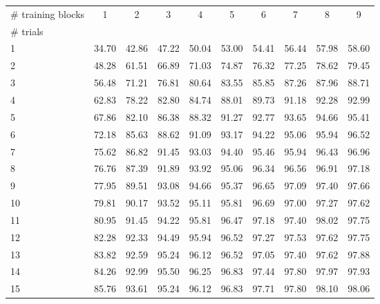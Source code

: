 \begin{tabular}{@{}lccccccccc@{}}
\toprule
\# training blocks & 1 & 2 & 3 & 4 & 5 & 6 & 7 & 8 & 9 \\
\# trials &  &  &  &  &  &  &  &  &  \\
\midrule
1 & 34.70 & 42.86 & 47.22 & 50.04 & 53.00 & 54.41 & 56.44 & 57.98 & 58.60 \\
2 & 48.28 & 61.51 & 66.89 & 71.03 & 74.87 & 76.32 & 77.25 & 78.62 & 79.45 \\
3 & 56.48 & 71.21 & 76.81 & 80.64 & 83.55 & 85.85 & 87.26 & 87.96 & 88.71 \\
4 & 62.83 & 78.22 & 82.80 & 84.74 & 88.01 & 89.73 & 91.18 & 92.28 & 92.99 \\
5 & 67.86 & 82.10 & 86.38 & 88.32 & 91.27 & 92.77 & 93.65 & 94.66 & 95.41 \\
6 & 72.18 & 85.63 & 88.62 & 91.09 & 93.17 & 94.22 & 95.06 & 95.94 & 96.52 \\
7 & 75.62 & 86.82 & 91.45 & 93.03 & 94.40 & 95.46 & 95.94 & 96.43 & 96.96 \\
8 & 76.76 & 87.39 & 91.89 & 93.92 & 95.06 & 96.34 & 96.56 & 96.91 & 97.18 \\
9 & 77.95 & 89.51 & 93.08 & 94.66 & 95.37 & 96.65 & 97.09 & 97.40 & 97.66 \\
10 & 79.81 & 90.17 & 93.52 & 95.11 & 95.81 & 96.69 & 97.00 & 97.27 & 97.62 \\
11 & 80.95 & 91.45 & 94.22 & 95.81 & 96.47 & 97.18 & 97.40 & 98.02 & 97.75 \\
12 & 82.28 & 92.33 & 94.49 & 95.94 & 96.52 & 97.27 & 97.53 & 97.62 & 97.75 \\
13 & 83.82 & 92.59 & 95.24 & 96.12 & 96.52 & 97.05 & 97.40 & 97.62 & 97.88 \\
14 & 84.26 & 92.99 & 95.50 & 96.25 & 96.83 & 97.44 & 97.80 & 97.97 & 97.93 \\
15 & 85.76 & 93.61 & 95.24 & 96.12 & 96.83 & 97.71 & 97.80 & 98.10 & 98.06 \\
\bottomrule
\end{tabular}
